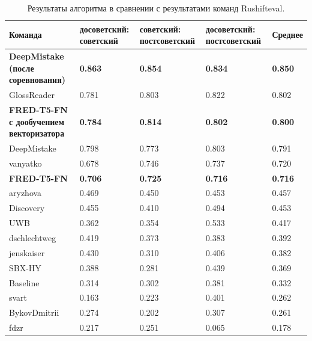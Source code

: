 \documentclass[LI,VKR]{HSEUniversity}
\begin{document}
\begin{table}[H]
\centering
\caption{Результаты алгоритма в сравнении с результатами команд Rushifteval.}
\begin{tabular}{|m{2.5cm}|m{3cm}|m{3cm}|m{3cm}|m{2.0cm}|}%
\hline
\textbf{Команда} & \textbf{досоветский:
советский} & \textbf{советский:
постсоветский} & \textbf{досоветский:
постсоветский} & \textbf{Среднее} \\%
\hline
\textbf{DeepMistake (после соревнования)} & \textbf{0.863} & \textbf{0.854} & \textbf{0.834} & \textbf{0.850} \\%
\hline
GlossReader & 0.781 & 0.803 & 0.822 & 0.802 \\%
\hline
\textbf{FRED-T5-FN с дообучением векторизатора} & \textbf{0.784} & \textbf{0.814} & \textbf{0.802} & \textbf{0.800} \\%
\hline
DeepMistake & 0.798 & 0.773 & 0.803 & 0.791 \\%
\hline
vanyatko & 0.678 & 0.746 & 0.737 & 0.720 \\%
\hline
\textbf{FRED-T5-FN} & \textbf{0.706} & \textbf{0.725} & \textbf{0.716} & \textbf{0.716} \\%
\hline
aryzhova & 0.469 & 0.450 & 0.453 & 0.457 \\%
\hline
Discovery & 0.455 & 0.410 & 0.494 & 0.453 \\%
\hline
UWB & 0.362 & 0.354 & 0.533 & 0.417 \\%
\hline
dschlechtweg & 0.419 & 0.373 & 0.383 & 0.392 \\%
\hline
jenskaiser & 0.430 & 0.310 & 0.406 & 0.382 \\%
\hline
SBX-HY & 0.388 & 0.281 & 0.439 & 0.369 \\%
\hline
Baseline & 0.314 & 0.302 & 0.381 & 0.332 \\%
\hline
svart & 0.163 & 0.223 & 0.401 & 0.262 \\%
\hline
BykovDmitrii & 0.274 & 0.202 & 0.307 & 0.261 \\%
\hline
fdzr & 0.217 & 0.251 & 0.065 & 0.178 \\%
\hline
\end{tabular}
\end{table}
\end{document}
